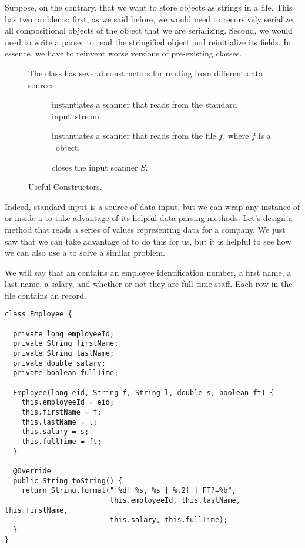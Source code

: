 Suppose, on the contrary, that we want to store objects as strings in a file. 
This has two problems: first, as we said before, we would need to recursively serialize all compositional objects of the object that we are serializing. 
Second, we would need to write a parser to read the stringified object and reinitialize its fields. 
In essence, we have to reinvent worse versions of pre-existing classes.

\begin{figure}[tp]
  \small
  \begin{tcolorbox}[title=Scanner Constructor Methods]
    The  class has several constructors for reading from different data sources.
    \vspace{2ex}
  \begin{description}
    \item [] instantiates a scanner that reads from the standard input~stream.
    \item [] instantiates a scanner that reads from the file $f$, where $f$ is a ~object.
    \item [] closes the input scanner $S$.
  \end{description}
\end{tcolorbox}
\caption{Useful  Constructors.}
\label{fig:sccons}
\end{figure}

Indeed, standard input is a source of data input, but we can wrap any instance of  or  inside a  to take advantage of its helpful data-parsing methods. 
Let's design a method that reads a series of values representing  data for a company. 
We just saw that we can take advantage of  to do this for us, but it is helpful to see how we can also use a  to solve a similar problem.

We will say that an  contains an employee identification number, a first name, a last name, a salary, and whether or not they are full-time staff. 
Each row in the file contains an  record.

\begin{lstlisting}[language=MyJava]
class Employee {

  private long employeeId;
  private String firstName;
  private String lastName;
  private double salary;
  private boolean fullTime;
  
  Employee(long eid, String f, String l, double s, boolean ft) {
    this.employeeId = eid;
    this.firstName = f;
    this.lastName = l;
    this.salary = s;
    this.fullTime = ft;
  }

  @Override
  public String toString() {
    return String.format("[%d] %s, %s | %.2f | FT?=%b", 
                         this.employeeId, this.lastName, this.firstName, 
                         this.salary, this.fullTime);
  }
}
\end{lstlisting}

